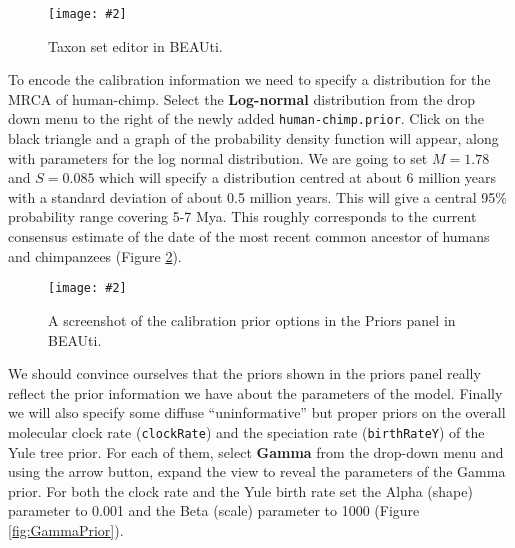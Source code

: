 \documentclass[11pt]{article}
\theoremstyle{plain}%
\theoremstyle{definition}
\theoremstyle{remark}
\newcommand{\includeimage}[2][]{%
\texttt{[image: \#2]}
}
\begin{document}
\begin{figure}
\centering
\includeimage[width=9cm]{figures/BEAUti_TaxonSets}
\label{fig:BEAUti_TaxonSets}
\caption{Taxon set editor in BEAUti.}
\end{figure}

To encode the calibration information we need to specify a distribution for the MRCA of human-chimp.
Select the \textbf{Log-normal} distribution from the drop down menu to the right of the newly added \texttt{human-chimp.prior}. 
Click on the black triangle and a graph of the probability density function will appear, along with parameters for the log normal distribution.
We are going to set $M=1.78$ and $S=0.085$ which will specify a distribution centred at about 6 million
years with a standard deviation of about 0.5 million years. This will give
a central 95\% probability range covering 5-7 Mya. This roughly corresponds to the current consensus
estimate of the date of the most recent common ancestor of humans and chimpanzees (Figure \ref{fig:BEAUti_Prior2}).


\begin{figure}
\centering	
\includeimage[width=\textwidth]{figures/BEAUti_Prior2}
\label{fig:BEAUti_Prior2}
\caption{A screenshot of the calibration prior options in the Priors panel in BEAUti.}
\end{figure}

We should convince ourselves that the priors shown in the priors panel really reflect the prior information we have about the parameters of the model. Finally we will also specify some diffuse ``uninformative'' but proper priors on the overall molecular clock rate (\texttt{clockRate}) and the speciation rate (\texttt{birthRateY}) of the Yule tree prior. For each of them, select \textbf{Gamma} from the drop-down menu
and using the arrow button, expand the view to reveal the parameters of the
Gamma prior. For both the clock rate and the Yule birth rate set the Alpha
(shape) parameter to 0.001 and the Beta (scale) parameter to 1000 (Figure \ref{fig:GammaPrior}).
\end{document}
